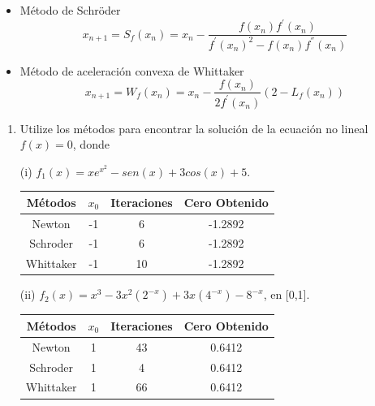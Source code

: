 \documentclass{udparticle}
\begin{document}
\begin{enumerate}
\begin{itemize}
        \item Método de Schröder
            \begin{equation*}
                x_{n+1}=S_f(x_n)=x_n-\frac{f(x_n)f^{'}(x_n)}{f^{'}(x_n)^{2}-f(x_n)f^{''}(x_n)}
            \end{equation*}
        
        \item Método de aceleración convexa de Whittaker
            \begin{equation*}
                x_{n+1}=W_f(x_n)=x_n - \frac{f(x_n)}{2f^{'}(x_n)}(2 - L_f(x_n))
            \end{equation*}
        
\end{itemize}
	\begin{enumerate}
	
		\item Utilize los métodos para encontrar la solución de la ecuación no lineal $f(x)=0$, donde
		
		(i) $f_{1}(x)=xe^{x^2}-sen(x)+3cos(x)+5$.
		
		\begin{table}[H]
			\centering
			\begin{tabular}{|c|c|c|c|}
				\hline
				Métodos & $x_{0}$ & Iteraciones & Cero Obtenido \\
				\hline
				Newton & -1 & 6 & -1.2892 \\
				\hline
				Schroder & -1 & 6 & -1.2892 \\
				\hline
				Whittaker & -1 & 10 & -1.2892 \\
				\hline				
			\end{tabular}
			\end{table}	
		
		
		
		(ii) $f_{2}(x)=x^3-3x^2(2^{-x})+3x(4^{-x})-8^{-x}$, en [0,1].
		
			\begin{table}[H]
			\centering
			\begin{tabular}{|c|c|c|c|}
				\hline
				Métodos & $x_{0}$ & Iteraciones & Cero Obtenido \\
				\hline
				Newton & 1 & 43 & 0.6412 \\
				\hline
				Schroder & 1 & 4 & 0.6412\\
				\hline
				Whittaker & 1 & 66 & 0.6412\\
				\hline				
			\end{tabular}
			\end{table}	
			

\end{enumerate}
\end{enumerate}
\end{document}
